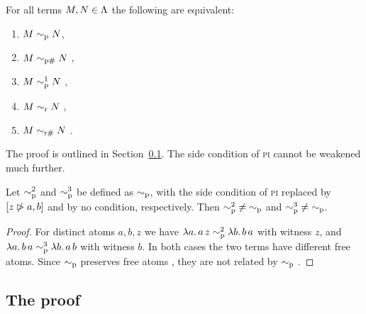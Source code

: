 \begin{theorem}
\label{thm:crole-equivalence}
For all terms $M, N \in \Lambda$ the following are equivalent:
\begin{enumerate}
  \item[(i)] $M \sim_{\mathrm{p}} N$,
  \item[(ii)] $M \sim_{\mathrm{p}\#} N$
    ,
  \item[(iii)] $M \sim^{1}_{\mathrm{p}} N$
    ,
  \item[(iv)] $M \sim_{\mathrm{r}} N$
    ,
  \item[(v)] $M \sim_{\mathrm{r}\#} N$
    .
\end{enumerate}
\end{theorem}

The proof is outlined in Section~\ref{subsec:key-lemmas}. The side
condition of \textsc{pi} cannot be weakened much further.

\begin{proposition}
\label{prop:variants}
Let $\sim^{2}_{\mathrm{p}}$
and $\sim^{3}_{\mathrm{p}}$
be defined as $\sim_{\mathrm{p}}$, with the side condition of \textsc{pi} replaced
by $[z \mathrel{\ntriangleright} a, b]$ and by no condition, respectively. Then
${\sim^{2}_{\mathrm{p}}} \neq {\sim_{\mathrm{p}}}$ and ${\sim^{3}_{\mathrm{p}}} \neq {\sim_{\mathrm{p}}}$.
\end{proposition}

\begin{proof}
For distinct atoms $a, b, z$ we have
$\lambda a.\,a\, z \sim^{2}_{\mathrm{p}} \lambda b.\,b\, a$
 with witness $z$, and
$\lambda a.\,b\, a \sim^{3}_{\mathrm{p}} \lambda b.\,a\, b$
 with witness $b$. In both cases the two
terms have different free atoms. Since $\sim_{\mathrm{p}}$ preserves free atoms
,
they are not related by $\sim_{\mathrm{p}}$
.
\end{proof}

\subsection{The proof}
\label{subsec:key-lemmas}

